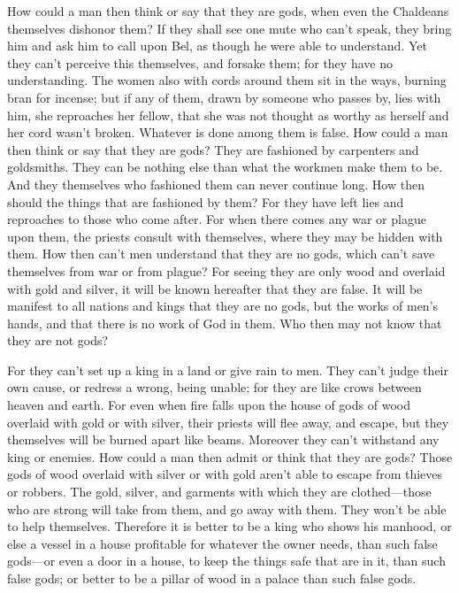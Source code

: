  How could a man then think or say that they are gods, when
even the Chaldeans themselves dishonor them?  If they shall
see one mute who can't speak, they bring him and ask him to call upon
Bel, as though he were able to understand.  Yet they can't
perceive this themselves, and forsake them; for they have no
understanding.  The women also with cords around them sit
in the ways, burning bran for incense; but if any of them, drawn by
someone who passes by, lies with him, she reproaches her fellow, that
she was not thought as worthy as herself and her cord wasn't broken.
 Whatever is done among them is false. How could a man then
think or say that they are gods?  They are fashioned by
carpenters and goldsmiths. They can be nothing else than what the
workmen make them to be.  And they themselves who fashioned
them can never continue long. How then should the things that are
fashioned by them?  For they have left lies and reproaches
to those who come after.  For when there comes any war or
plague upon them, the priests consult with themselves, where they may be
hidden with them.  How then can't men understand that they
are no gods, which can't save themselves from war or from plague?
 For seeing they are only wood and overlaid with gold and
silver, it will be known hereafter that they are false.  It
will be manifest to all nations and kings that they are no gods, but the
works of men's hands, and that there is no work of God in them.
 Who then may not know that they are not gods?

 For they can't set up a king in a land or give rain to
men.  They can't judge their own cause, or redress a wrong,
being unable; for they are like crows between heaven and earth.
 For even when fire falls upon the house of gods of wood
overlaid with gold or with silver, their priests will flee away, and
escape, but they themselves will be burned apart like beams.
 Moreover they can't withstand any king or enemies. How
could a man then admit or think that they are gods?  Those
gods of wood overlaid with silver or with gold aren't able to escape
from thieves or robbers.  The gold, silver, and garments
with which they are clothed---those who are strong will take from them,
and go away with them. They won't be able to help themselves.
 Therefore it is better to be a king who shows his manhood,
or else a vessel in a house profitable for whatever the owner needs,
than such false gods---or even a door in a house, to keep the things
safe that are in it, than such false gods; or better to be a pillar of
wood in a palace than such false gods.


